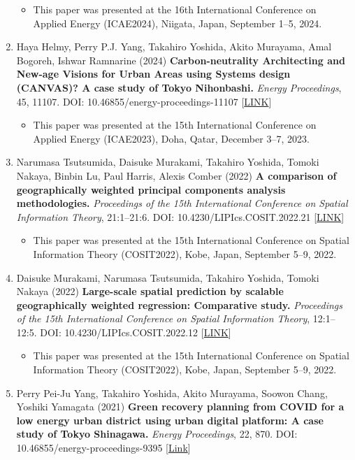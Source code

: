 \documentclass[
]{book}
\providecommand{\tightlist}{%
  \setlength{\itemsep}{0pt}\setlength{\parskip}{0pt}}
\begin{document}
\begin{enumerate}
  \begin{itemize}
  \tightlist
  \item
    This paper was presented at the 16th International Conference on Applied Energy (ICAE2024), Niigata, Japan, September 1--5, 2024.
  \end{itemize}
\item
  Haya Helmy, Perry P.J. Yang, Takahiro Yoshida, Akito Murayama, Amal Bogoreh, Ishwar Ramnarine (2024)
  \textbf{Carbon-neutrality Architecting and New-age Visions for Urban Areas using Systems design (CANVAS)? A case study of Tokyo Nihonbashi.}
  \emph{Energy Proceedings}, 45, 11107.
  DOI: 10.46855/energy-proceedings-11107 {[}\href{https://doi.org/10.46855/energy-proceedings-11107}{LINK}{]}

  \begin{itemize}
  \tightlist
  \item
    This paper was presented at the 15th International Conference on Applied Energy (ICAE2023), Doha, Qatar, December 3--7, 2023.
  \end{itemize}
\item
  Narumasa Tsutsumida, Daisuke Murakami, Takahiro Yoshida, Tomoki Nakaya, Binbin Lu, Paul Harris, Alexis Comber (2022)
  \textbf{A comparison of geographically weighted principal components analysis methodologies.}
  \emph{Proceedings of the 15th International Conference on Spatial Information Theory}, 21:1--21:6.
  DOI: 10.4230/LIPIcs.COSIT.2022.21 {[}\href{https://doi.org/10.4230/LIPIcs.COSIT.2022.21}{LINK}{]}

  \begin{itemize}
  \tightlist
  \item
    This paper was presented at the 15th International Conference on Spatial Information Theory (COSIT2022), Kobe, Japan, September 5--9, 2022.
  \end{itemize}
\item
  Daisuke Murakami, Narumasa Tsutsumida, Takahiro Yoshida, Tomoki Nakaya (2022)
  \textbf{Large-scale spatial prediction by scalable geographically weighted regression: Comparative study.}
  \emph{Proceedings of the 15th International Conference on Spatial Information Theory}, 12:1--12:5.
  DOI: 10.4230/LIPIcs.COSIT.2022.12 {[}\href{https://doi.org/10.4230/LIPIcs.COSIT.2022.12}{LINK}{]}

  \begin{itemize}
  \tightlist
  \item
    This paper was presented at the 15th International Conference on Spatial Information Theory (COSIT2022), Kobe, Japan, September 5--9, 2022.
  \end{itemize}
\item
  Perry Pei-Ju Yang, Takahiro Yoshida, Akito Murayama, Soowon Chang, Yoshiki Yamagata (2021)
  \textbf{Green recovery planning from COVID for a low energy urban district using urban digital platform: A case study of Tokyo Shinagawa.}
  \emph{Energy Proceedings}, 22, 870.
  DOI: 10.46855/energy-proceedings-9395 {[}\href{https://doi.org/10.46855/energy-proceedings-9395}{Link}{]}


\end{enumerate}
\end{document}
